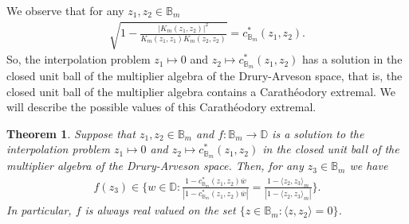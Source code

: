 \documentclass[12pt]{amsart}
\newtheorem{theorem}{Theorem}[section]
\theoremstyle{definition}
\numberwithin{equation}{section}
\newcommand{\D}{\mathbb{D}}
\begin{document}
We observe that for any $z_1,z_2\in \mathbb{B}_m$ 
\begin{align*}
	\sqrt{1-\frac{|K_m(z_1, z_2)|^2}{K_m(z_1,z_1)K_m(z_2,z_2)}}=c^* _{\mathbb{B}_m} (z_1,z_2).
\end{align*}
So, the interpolation problem $z_1\mapsto 0$ and $z_2\mapsto c^* _{\mathbb{B}_m} (z_1,z_2)$ has a solution in the closed unit ball of the multiplier algebra of the Drury-Arveson space, that is, the closed unit ball of the multiplier algebra contains a Carath\'eodory extremal. We will describe the possible values of this Carath\'eodory extremal.
\begin{theorem}
	Suppose that $z_1,z_2\in \mathbb{B}_m$ and $f:\mathbb{B}_m\rightarrow \mathbb{D}$ is a solution to the interpolation problem $z_1\mapsto 0$ and $z_2\mapsto c^* _{\mathbb{B}_m} (z_1,z_2)$ in the closed unit ball of the multiplier algebra of the Drury-Arveson space. Then, for any $z_3\in \mathbb{B}_m$ we have
	\begin{align*}
		f(z_3)\in \Big\{w\in \D : \frac{1-c^* _{\mathbb{B}_m} (z_1,z_2) \overline{w}}{|1-c^* _{\mathbb{B}_m} (z_1,z_2) \overline{w}|}=\frac{1-\langle z_2,z_3\rangle_m}{|1-\langle z_2,z_3\rangle_m|}\Big\}.
	\end{align*}
	In particular, $f$ is always real valued on the set $\{z\in \mathbb{B}_m:\langle z,z_2\rangle =0\}$.
\end{theorem}
\end{document}
